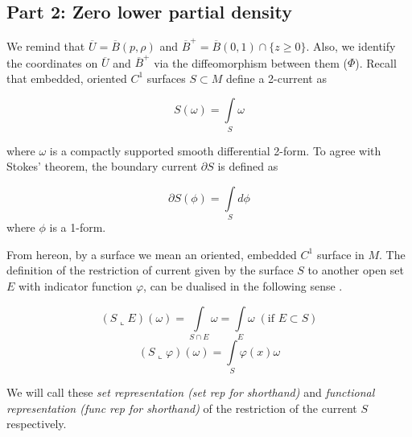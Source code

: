 \documentclass{amsart}
\newtheorem{definition}{Definition}
\theoremstyle{named}
\begin{document}
\subsection{Part 2: Zero lower partial density}

We remind that $\overline{U} = \overline{B}(p,\rho)$ and $\overline{B}^{+} = \overline{B}(0,1) \cap \{ z \geq 0 \}$. Also, we identify the coordinates on $\overline{U}$ and $\overline{B}^{+}$ via the diffeomorphism between them ($\Phi$). Recall that embedded, oriented $C^1$ surfaces $S \subset M$ define a 2-current as 

    \begin{equation} \nonumber 
        S(\omega) = \int\limits_{S}\omega
    \end{equation}

    where $\omega$ is a compactly supported smooth differential 2-form. To agree with Stokes' theorem, the boundary current $\partial S$ is defined as 

    \begin{equation} \nonumber 
        \partial S(\phi) = \int\limits_{S}d\phi
    \end{equation}
     where $\phi$ is a 1-form.

From hereon, by a surface we mean an oriented, embedded $C^1$ surface in $M$. The definition of the restriction of current given by the surface $S$ to another open set $E$ with indicator function $\varphi$, can be dualised in the following sense \cite{simon}.

    \begin{equation}
        (S \llcorner E)(\omega) = \int\limits_{S \cap E}\omega = \int\limits_{ E}\omega \;(\text{if } E \subset S)
    \end{equation}
    \begin{equation}
        (S \llcorner \varphi)(\omega) = \int\limits_{S}\varphi(x)\omega
    \end{equation}
    
We will call these \textit{set representation (set rep for shorthand)} and \textit{functional representation (func rep for shorthand)} of the restriction of the current $S$ respectively. \\

\end{document}
